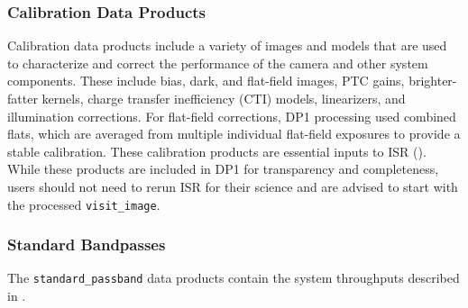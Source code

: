 \subsubsection{Calibration Data Products}
\label{ssec:calibration_data}
Calibration data products include a variety of images and models that are used to characterize and correct the performance of the \gls{camera} and other system components.
These include bias, dark, and flat-field images, \gls{PTC} gains, brighter-fatter kernels, charge transfer inefficiency (\gls{CTI}) models, linearizers, and illumination corrections.
For flat-field corrections, \gls{DP1} processing used combined flats, which are averaged from multiple individual flat-field exposures to provide a stable \gls{calibration}. These \gls{calibration} products are essential inputs to \gls{ISR} (). While these products are included in \gls{DP1} for transparency and completeness, users should not need to rerun ISR for their science and are advised to start with the processed \texttt{visit\_image}.

\subsubsection{Standard Bandpasses}
\label{ssec:bandpasses_dataproducts}
The \texttt{standard\_passband} data products contain the system throughputs described in .

% 







